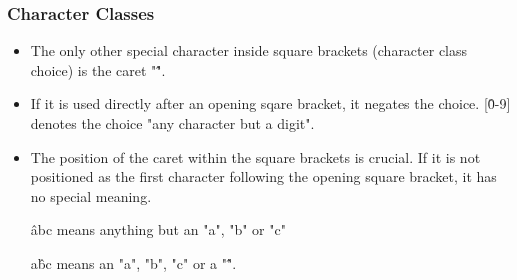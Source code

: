  \begin{frame}[fragile]
\frametitle{Character Classes}

\begin{itemize}
\item The only other special character inside square brackets (character class choice) is the caret "\^".
\item  If it is used directly after an opening sqare bracket, it negates the choice. [\^0-9] denotes the choice "any character but a digit". 
\item The position of the caret within the square brackets is crucial. If it is not positioned as the first character following the opening square bracket, it has no special meaning. 
\item [\^abc] means anything but an "a", "b" or "c" 
\item [a\^bc] means an "a", "b", "c" or a "\^". 
\end{itemize}

\end{frame}



